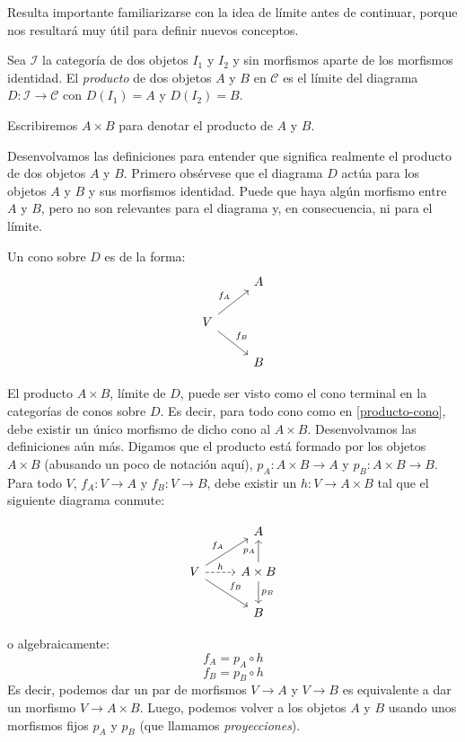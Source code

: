 \documentclass[12pt, twoside]{book}
\newcommand{\cat}{{\mathcal{C}}}
\begin{document}
Resulta importante familiarizarse con la idea de límite antes de continuar, porque nos resultará muy útil para definir nuevos conceptos.

\begin{definition}
Sea $\mathcal{I}$ la categoría de dos objetos $I_1$ y $I_2$ y sin morfismos aparte de los morfismos identidad. El \emph{producto} de dos objetos $A$ y $B$ en $\cat$ es el límite del diagrama $D \colon \mathcal{I} \to \cat$ con $D(I_1) = A$ y $D(I_2) = B$.

Escribiremos $A \times B$ para denotar el producto de $A$ y $B$.
\end{definition}

Desenvolvamos las definiciones para entender que significa realmente el producto de dos objetos $A$ y $B$.
Primero obsérvese que el diagrama $D$ actúa para  los objetos $A$ y $B$ y sus morfismos identidad.
Puede que haya algún morfismo entre $A$ y $B$, pero no son relevantes para el diagrama y, en consecuencia, ni para el límite.

Un cono sobre $D$ es de la forma:
\begin{equation}\label{producto-cono} \begin{tikzcd}
 & A\\
V \arrow[ur,"f_A"] \arrow[dr,"f_B"]\\
 & B
\end{tikzcd} \end{equation}

El producto $A \times B$, límite de $D$, puede ser visto como el cono terminal en la categorías de conos sobre $D$.
Es decir, para todo cono como en \ref{producto-cono}, debe existir un único morfismo de dicho cono al $A \times B$.
Desenvolvamos las definiciones aún más.
Digamos que el producto está formado por los objetos $A \times B$ (abusando un poco de notación aquí), $p_A \colon A \times B \to A$ y $p_B \colon A \times B \to B$.
Para todo $V$, $f_A \colon V \to A$ y $f_B \colon V \to B$, debe existir un $h \colon V \to A \times B$ tal que el siguiente diagrama conmute:

\[\begin{tikzcd}
 & A\\
V \arrow[ur,"f_A"] \arrow[dr,"f_B"] \arrow[r,dashed,"h"] & A \times B \arrow[u,"p_A"] \arrow[d,"p_B"]\\
 & B
\end{tikzcd}\]

o algebraicamente:
\[ f_A = p_A \circ h \]
\[ f_B = p_B \circ h \]
Es decir, podemos dar un par de morfismos $V \to A$ y $V \to B$ es equivalente a dar un morfismo $V \to A \times B$.
Luego, podemos volver a los objetos $A$ y $B$ usando unos morfismos fijos $p_A$ y $p_B$ (que llamamos \emph{proyecciones}).
\end{document}
